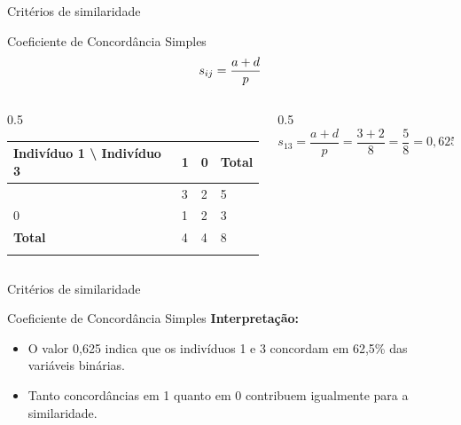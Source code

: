 \documentclass[
  ignorenonframetext,
  aspectratio=169,
]{beamer}
\begin{document}
\begin{frame}{Critérios de similaridade}
\label{crituxe9rios-de-similaridade}
\begin{block}{Coeficiente de Concordância Simples}
\label{coeficiente-de-concorduxe2ncia-simples}
\[\Large s_{ij} = \displaystyle{\frac{a + d}{p}}\]

\begin{columns}[T]
\begin{column}{0.5\linewidth}
\begin{longtable}[]{@{}llll@{}}
\toprule\noalign{}
Indivíduo 1 \textbackslash{} Indivíduo 3 & 1 & 0 & Total \\
\midrule\noalign{}
\endhead
1 & 3 & 2 & 5 \\
0 & 1 & 2 & 3 \\
\textbf{Total} & 4 & 4 & 8 \\
\bottomrule\noalign{}
\end{longtable}
\end{column}

\begin{column}{0.5\linewidth}
\[
s_{13} = \dfrac{a + d}{p}
               = \dfrac{3 + 2}{8}
               = \dfrac{5}{8}
               = 0,625
\]
\end{column}
\end{columns}
\end{block}
\end{frame}

\begin{frame}{Critérios de similaridade}
\label{crituxe9rios-de-similaridade-1}
\begin{block}{Coeficiente de Concordância Simples}
\label{coeficiente-de-concorduxe2ncia-simples-1}
\textbf{Interpretação:}

\begin{itemize}
\item
  O valor 0,625 indica que os indivíduos 1 e 3 concordam em 62,5\% das
  variáveis binárias.
\item
  Tanto concordâncias em 1 quanto em 0 contribuem igualmente para a
  similaridade.
\end{itemize}
\end{block}
\end{frame}
\end{document}
